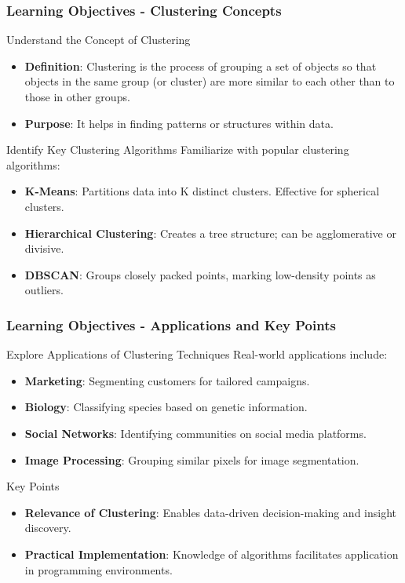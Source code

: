 \documentclass[aspectratio=169]{beamer}
\begin{document}
\begin{frame}[fragile]
    \frametitle{Learning Objectives - Clustering Concepts}
    \begin{block}{Understand the Concept of Clustering}
        \begin{itemize}
            \item \textbf{Definition}: Clustering is the process of grouping a set of objects so that objects in the same group (or cluster) are more similar to each other than to those in other groups.
            \item \textbf{Purpose}: It helps in finding patterns or structures within data.
        \end{itemize}
    \end{block}
    
    \begin{block}{Identify Key Clustering Algorithms}
        Familiarize with popular clustering algorithms:
        \begin{itemize}
            \item \textbf{K-Means}: Partitions data into K distinct clusters. Effective for spherical clusters.
            \item \textbf{Hierarchical Clustering}: Creates a tree structure; can be agglomerative or divisive.
            \item \textbf{DBSCAN}: Groups closely packed points, marking low-density points as outliers.
        \end{itemize}
    \end{block}
\end{frame}

\begin{frame}[fragile]
    \frametitle{Learning Objectives - Applications and Key Points}
    \begin{block}{Explore Applications of Clustering Techniques}
        Real-world applications include:
        \begin{itemize}
            \item \textbf{Marketing}: Segmenting customers for tailored campaigns.
            \item \textbf{Biology}: Classifying species based on genetic information.
            \item \textbf{Social Networks}: Identifying communities on social media platforms.
            \item \textbf{Image Processing}: Grouping similar pixels for image segmentation.
        \end{itemize}
    \end{block}

    \begin{block}{Key Points}
        \begin{itemize}
            \item \textbf{Relevance of Clustering}: Enables data-driven decision-making and insight discovery.
            \item \textbf{Practical Implementation}: Knowledge of algorithms facilitates application in programming environments.
        \end{itemize}
    \end{block}
\end{frame}
\end{document}
